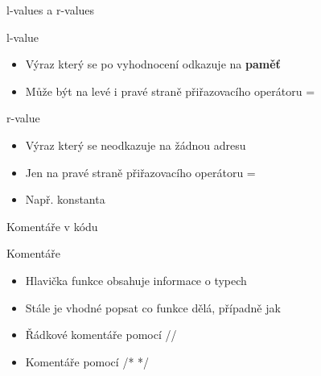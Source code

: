 \documentclass[9pt]{beamer}
\begin{document}
\begin{frame}{l-values a r-values}
    \begin{block}{l-value}
        \begin{itemize}
            \item Výraz který se po vyhodnocení odkazuje na \textbf{paměť}
            \item Může být na levé i pravé straně přiřazovacího operátoru =
        \end{itemize}
    \end{block}
    \begin{block}{r-value}
        \begin{itemize}
            \item Výraz který se neodkazuje na žádnou adresu
            \item Jen na pravé straně přiřazovacího operátoru =
            \item Např. konstanta
        \end{itemize}
    \end{block}
\end{frame}

\begin{frame}{Komentáře v kódu}
    \begin{block}{Komentáře}
        \begin{itemize}
            \item Hlavička funkce obsahuje informace o typech
            \item Stále je vhodné popsat co funkce dělá, případně jak
            \item Řádkové komentáře pomocí //
            \item Komentáře pomocí /*   */
        \end{itemize}
    \end{block}
    
\end{frame}
\end{document}
